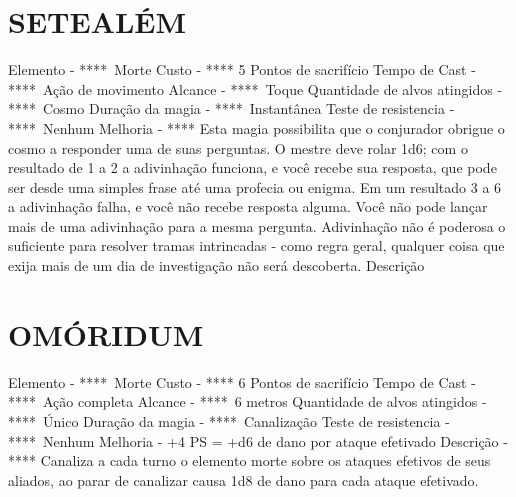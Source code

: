 \documentclass{article}%
\begin{document}
\section{SETEALÉM}%
\label{sec:SETEALM}%
Elemento {-} ****~Morte\newline%
Custo {-} **** 5 Pontos de sacrifício\newline%
Tempo de Cast {-} ****~Ação de movimento\newline%
Alcance {-} ****~Toque\newline%
Quantidade de alvos atingidos {-} ****~Cosmo\newline%
Duração da magia {-} ****~Instantânea\newline%
Teste de resistencia {-} ****~Nenhum\newline%
Melhoria {-} **** Esta magia possibilita que o conjurador obrigue o cosmo a responder uma de suas perguntas. O mestre deve rolar 1d6; com o resultado de 1 a 2 a adivinhação funciona, e você recebe sua resposta, que pode ser desde uma simples frase até uma profecia ou enigma. Em um resultado 3 a 6 a adivinhação falha, e você não recebe resposta alguma. Você não pode lançar mais de uma adivinhação para a mesma pergunta. Adivinhação não é poderosa o suficiente para resolver tramas intrincadas {-} como regra geral, qualquer coisa que exija mais de um dia de investigação não será descoberta.\newline%
Descrição \newline%

%
\section{OMÓRIDUM}%
\label{sec:OMRIDUM}%
Elemento {-} ****~Morte\newline%
Custo {-} **** 6 Pontos de sacrifício\newline%
Tempo de Cast {-} ****~Ação completa\newline%
Alcance {-} ****~6 metros\newline%
Quantidade de alvos atingidos {-} ****~Único\newline%
Duração da magia {-} ****~Canalização\newline%
Teste de resistencia {-} ****~Nenhum\newline%
Melhoria {-}  +4 PS = +d6 de dano por ataque efetivado\newline%
Descrição {-} **** Canaliza a cada turno o elemento morte sobre os ataques efetivos de seus aliados, ao parar de canalizar causa 1d8 de dano para cada ataque efetivado.\newline%
\end{document}
